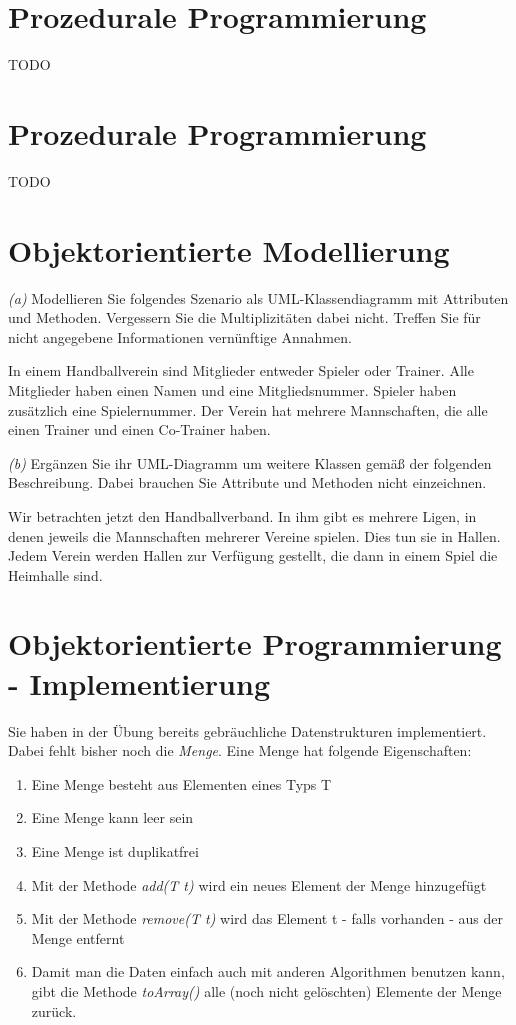 \documentclass[11pt,a4paper,oneside,ngerman]{scrbook}
\begin{document}
\newpage

\section{Prozedurale Programmierung}

TODO
\newpage


\section{Prozedurale Programmierung}

TODO
\newpage

\section{Objektorientierte Modellierung}
\emph{(a)} Modellieren Sie folgendes Szenario als UML-Klassendiagramm mit Attributen und Methoden. Vergessern Sie die Multiplizitäten dabei nicht. Treffen Sie für nicht angegebene Informationen vernünftige Annahmen.

In einem Handballverein sind Mitglieder entweder Spieler oder Trainer. Alle Mitglieder haben einen Namen und eine Mitgliedsnummer. Spieler haben zusätzlich eine Spielernummer. Der Verein hat mehrere Mannschaften, die alle einen Trainer und einen Co-Trainer haben.


\newpage

\emph{(b)} Ergänzen Sie ihr UML-Diagramm um weitere Klassen gemäß der folgenden Beschreibung. Dabei brauchen Sie Attribute und Methoden nicht einzeichnen.

Wir betrachten jetzt den Handballverband. In ihm gibt es mehrere Ligen, in denen jeweils die Mannschaften mehrerer Vereine spielen. Dies tun sie in Hallen. Jedem Verein werden Hallen zur Verfügung gestellt, die dann in einem Spiel die Heimhalle sind.


\newpage

\section{Objektorientierte Programmierung - Implementierung}
Sie haben in der Übung bereits gebräuchliche Datenstrukturen implementiert. Dabei fehlt bisher noch die \emph{Menge}.
Eine Menge hat folgende Eigenschaften:

\begin{enumerate}
  \item Eine Menge besteht aus Elementen eines Typs T
  \item Eine Menge kann leer sein
  \item Eine Menge ist duplikatfrei
  \item Mit der Methode \emph{add(T t)} wird ein neues Element der Menge hinzugefügt
  \item Mit der Methode \emph{remove(T t)} wird das Element t - falls vorhanden - aus der Menge entfernt
  \item Damit man die Daten einfach auch mit anderen Algorithmen benutzen kann, gibt die Methode \emph{toArray()} alle (noch nicht gelöschten) Elemente der Menge zurück.
\end{enumerate}
\end{document}
